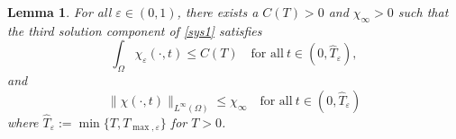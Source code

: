 \documentclass[a4paper,10pt]{article}
\newtheorem{Lemma}[Theorem]{Lemma}
\theoremstyle{definition}
\begin{document}
\begin{Lemma}
    \label{lemma_chi}
    For all $\varepsilon \in (0, 1)$, there exists a $C(T) > 0$ and $\chi_\infty > 0$ such that the third solution component of \eqref{sys1} satisfies
  \begin{equation}
    \label{l1c2chi}
    \int_\Omega \chi_{\varepsilon}(\cdot, t) \leq C(T) \quad \text{for all}~ t \in (0, \widehat{T}_\varepsilon),
  \end{equation}
  and
   \begin{equation}
   \label{chi_bound2}
   \|\chi(\cdot, t)\|_{L^\infty(\Omega)} \leq \chi_\infty \quad \text{for all}~ t \in (0, \widehat{T}_\varepsilon)
  \end{equation}
  where $\widehat{T}_\varepsilon := \min\{T, T_{\max, \varepsilon}\}$ for $T > 0$.
\end{Lemma}
\end{document}
